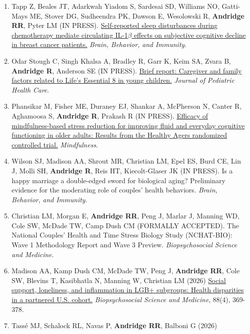 \documentclass[
  english,
  letterpaper,
  DIV=11,
  numbers=noendperiod]{scrartcl}
\providecommand{\tightlist}{%
  \setlength{\itemsep}{0pt}\setlength{\parskip}{0pt}}
\begin{document}
\begin{enumerate}
\def\labelenumi{\arabic{enumi}.}
\tightlist
\item
  Tapp Z, Beales JT, Adarkwah Yiadom S, Sardesai SD, Williams NO,
  Gatti-Mays ME, Stover DG, Sudheendra PK, Dawson E, Wesolowski R,
  \textbf{Andridge RR}, Pyter LM (IN PRESS).
  \href{https://doi.org/10.1016/j.bbi.2026.107089}{Self-reported sleep
  disturbances during chemotherapy mediate circulating IL-1\(\beta\)
  effects on subjective cognitive decline in breast cancer patients.}
  \emph{Brain, Behavior, and Immunity}.
\item
  Odar Stough C, Singh Khalsa A, Bradley R, Garr K, Keim SA, Zvara B,
  \textbf{Andridge R}, Anderson SE (IN PRESS).
  \href{https://doi.org/10.1016/j.pedhc.2026.08.004}{Brief report:
  Caregiver and family factors related to Life's Essential 8 in young
  children.} \emph{Journal of Pediatric Health Care}.
\item
  Phansikar M, Fisher ME, Duraney EJ, Shankar A, McPherson N, Canter R,
  Aghamoosa S, \textbf{Andridge R}, Prakash R (IN PRESS).
  \href{https://doi.org/10.1007/s12671-026-02970-z}{Efficacy of
  mindfulness-based stress reduction for improving fluid and everyday
  cognitive functioning in older adults: Results from the Healthy Agers
  randomized controlled trial.} \emph{Mindfulness}.
\item
  Wilson SJ, Madison AA, Shrout MR, Christian LM, Epel ES, Burd CE, Lin
  J, Molli SH, \textbf{Andridge R}, Reis HT, Kiecolt-Glaser JK (IN
  PRESS). Is a happy marriage a double-edged sword for biological aging?
  Preliminary evidence for the moderating role of couples' health
  behaviors. \emph{Brain, Behavior, and Immunity}.
\item
  Christian LM, Morgan E, \textbf{Andridge RR}, Peng J, Marlar J,
  Manning WD, Cole SW, McDade TW, Camp Dush CM (FORMALLY ACCEPTED). The
  National Couples' Health and Time Stress Biology Study (NCHAT-BIO):
  Wave 1 Methodology Report and Wave 3 Preview. \emph{Biopsychosocial
  Science and Medicine}.
\item
  Madison AA, Kamp Dush CM, McDade TW, Peng J, \textbf{Andridge RR},
  Cole SW, Blevins T, Kasibhatla N, Manning W, Christian LM (2026)
  \href{https://doi.org/10.1097/psy.0000000000001476}{Social support,
  loneliness, and inflammation in LGB+ subgroups: Health disparities in
  a partnered U.S. cohort.} \emph{Biopsychosocial Science and Medicine},
  88(4), 369-378.
\item
  Tassé MJ, Schalock RL, Navas P, \textbf{Andridge RR}, Balboni G (2026)

\end{enumerate}
\end{document}
